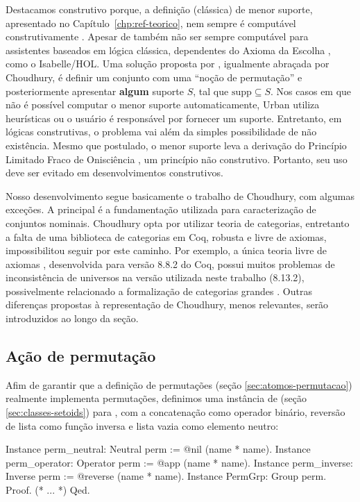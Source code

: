 Destacamos construtivo porque, a definição (clássica) de menor suporte, apresentado no Capítulo~\ref{chp:ref-teorico}, nem sempre é computável construtivamente \cite{Swan2016,Swan2017}. Apesar de também não ser sempre computável para assistentes baseados em lógica clássica, dependentes do Axioma da Escolha \cite{Pitts2006}, como o Isabelle/HOL. Uma solução proposta por \cite{Urban2008}, igualmente abraçada por Choudhury, é definir um conjunto com uma ``noção de permutação'' e posteriormente apresentar \textbf{algum} suporte $S$, tal que $\text{supp} \subseteq S$. Nos casos em que não é possível computar o menor suporte automaticamente, Urban utiliza heurísticas ou o usuário é responsável por fornecer um suporte. Entretanto, em lógicas construtivas, o problema vai além da simples possibilidade de não existência. Mesmo que postulado, o menor suporte leva a derivação do Princípio Limitado Fraco de Onisciência \cite{Swan2017}, um princípio não construtivo. Portanto, seu uso deve ser evitado em desenvolvimentos construtivos. 


Nosso desenvolvimento segue basicamente o trabalho de Choudhury, com algumas exceções. A principal é a fundamentação utilizada para caracterização de conjuntos nominais. Choudhury opta por utilizar teoria de categorias, entretanto a falta de uma biblioteca de categorias em Coq, robusta e livre de axiomas, impossibilitou seguir por este caminho. Por exemplo, a única teoria livre de axiomas \cite{Wiegley}, desenvolvida para versão 8.8.2 do Coq, possui muitos problemas de inconsistência de universos na versão utilizada neste trabalho (8.13.2), possivelmente relacionado a formalização de categorias grandes \cite{Gross2014}. Outras diferenças propostas à representação de Choudhury, menos relevantes, serão introduzidos ao longo da seção.

\subsection{Ação de permutação}
Afim de garantir que a definição de permutações (seção \ref{sec:atomos-permutacao}) realmente implementa permutações, definimos uma instância de  (seção \ref{sec:classes-setoids}) para , com a concatenação como operador binário, reversão de lista como função inversa e lista vazia como elemento neutro:
\begin{coqcode}
Instance perm_neutral: Neutral perm := @nil (name * name).
Instance perm_operator: Operator perm := @app (name * name).
Instance perm_inverse: Inverse perm := @reverse (name * name).
Instance PermGrp: Group perm. Proof. (* ... *) Qed.
\end{coqcode}

